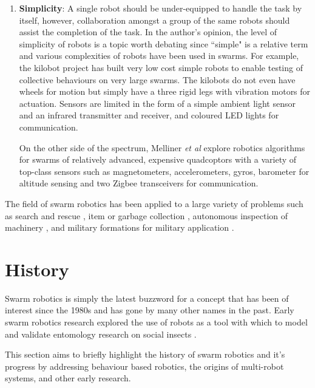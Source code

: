 \begin{enumerate}
\item \textbf{Simplicity}: A single robot should be under-equipped to handle the task by itself, however, collaboration amongst a group of the same robots should assist the completion of the task. In the author's opinion, the level of simplicity of robots is a topic worth debating since ``simple" is a relative term and various complexities of robots have been used in swarms. For example, the kilobot project \cite{rubenstein2012kilobot} has built very low cost simple robots to enable testing of collective behaviours on very large swarms. The kilobots do not even have wheels for motion but simply have a three rigid legs with vibration motors for actuation. Sensors are limited in the form of a simple ambient light sensor and an infrared transmitter and receiver, and coloured LED lights for communication. 

On the other side of the spectrum, Melliner \textit{et al} \cite{kushleyev2013towards, mellinger2013cooperative} explore robotics algorithms for swarms of relatively advanced, expensive quadcoptors with a variety of top-class sensors such as magnetometers, accelerometers, gyros, barometer for altitude sensing and two Zigbee transceivers for communication.
\end{enumerate}

 The field of swarm robotics has been applied to a large variety of problems such as search and rescue \cite{mondada2002search}, item or garbage collection \cite{balch1995io}, autonomous inspection of machinery \cite{correll2007challenging}, and military formations for military application \cite{balch1998behavior}.



\section{History}
\label{history}
 
Swarm robotics is simply the latest buzzword for a concept that has been of interest since the 1980s and has gone by many other names in the past. Early swarm robotics research explored the use of robots as a tool with which to model and validate entomology research on social insects \cite{dorigo2014swarm, beni1993swarm, seeley2009wisdom}.

This section aims to briefly highlight the history of swarm robotics and it's progress by addressing behaviour based robotics, the origins of multi-robot systems, and other early research.

